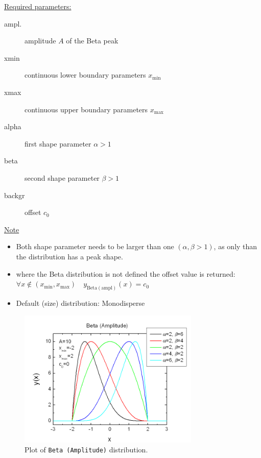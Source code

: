 \uline{Required parameters:}
\begin{description}
    \item[ampl.] amplitude $A$ of the Beta peak
    \item[xmin] continuous lower boundary parameters $x_\mathrm{min}$
    \item[xmax] continuous upper boundary parameters $x_\mathrm{max}$
    \item[alpha] first shape parameter $\alpha>1$
    \item[beta]  second shape parameter $\beta>1$
    \item[backgr] offset $c_0$
\end{description}

\uline{Note}
\begin{itemize}
  \item Both shape parameter needs to be larger than one $(\alpha,\beta>1)$, as only than
  the distribution has a peak shape.
  \item where the Beta distribution is not defined the offset value is returned: \\
  $\forall x\notin (x_\mathrm{min},x_\mathrm{max})\quad y_\mathrm{Beta (ampl)}(x) = c_0$
  \item Default (size) distribution: Monodisperse
\end{itemize}

\begin{figure}[htb]
\begin{center}
\includegraphics[width=0.768\textwidth]{BetaAmplitude.png}
\end{center}
\caption{Plot of \texttt{Beta (Amplitude)} distribution.}
\label{fig:BetaAmplitude}
\end{figure}
\vspace{5mm}

